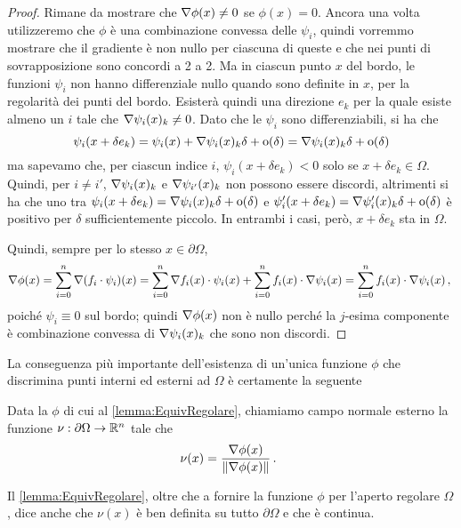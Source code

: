 \begin{proof}
	Rimane da mostrare che $\nabla \phi(x)\neq 0$ se $\phi(x)=0$. Ancora una volta utilizzeremo che $\phi$ è una combinazione convessa delle $\psi_i$, quindi vorremmo mostrare che il gradiente è non nullo per ciascuna di queste e che nei punti di sovrapposizione sono concordi a 2 a 2.
	Ma in ciascun punto $x$ del bordo, le funzioni $\psi_i$ non hanno differenziale nullo quando sono definite in $x$, per la regolarità dei punti del bordo. Esisterà quindi una direzione $e_k$ per la quale esiste almeno un $i$ tale che $\nabla \psi_i(x)_k\neq 0$.
	Dato che le $\psi_i$ sono differenziabili, si ha che
	\[
		\psi_i(x+\delta e_k)=\psi_i(x)+\nabla \psi_i(x)_k \delta + \mathrm{o}(\delta) = \nabla \psi_i(x)_k \delta + \mathrm{o}(\delta)
	\]
	ma sapevamo che, per ciascun indice $i$, $\psi_i(x+\delta e_k)<0$ solo se $x+\delta e_k\in \Omega$.
	Quindi, per $i\neq i'$, $\nabla \psi_i(x)_k$ e $\nabla \psi_{i'}(x)_k$ non possono essere discordi, altrimenti si ha che uno tra $\psi_i(x+\delta e_k)= \nabla \psi_i(x)_k \delta + \mathrm{o}(\delta)$ e
	$\psi_i'(x+\delta e_k)=\nabla \psi_i'(x)_k \delta + \mathrm{o}(\delta)$ è positivo per $\delta$ sufficientemente piccolo. In entrambi i casi, però, $x+\delta e_k$ sta in $\Omega$.
	
	Quindi, sempre per lo stesso $x\in\partial \Omega$,
	\[ 
		\nabla \phi(x)=\sum_{i=0}^n \nabla (f_i \cdot\psi_i)(x)=\sum_{i=0}^n \nabla f_i(x)\cdot \psi_i(x)+\sum_{i=0}^n f_i(x)\cdot \nabla \psi_i(x)=
		\sum_{i=0}^n f_i(x)\cdot \nabla  \psi_i(x)\, \text{, }
	\]
	poiché $\psi_i\equiv 0$ sul bordo; quindi $\nabla \phi(x)$ non è nullo perché la $j$-esima componente è combinazione convessa di
	$\nabla \psi_i(x)_k$ che sono non discordi.
\end{proof}

La conseguenza più importante dell'esistenza di un'unica funzione $\phi$ che discrimina punti interni ed esterni ad $\Omega$ è certamente la seguente

\begin{definition}
	Data la $\phi$ di cui al \cref{lemma:EquivRegolare}, chiamiamo campo normale esterno la funzione $\nu:\partial\Omega\rightarrow \mathbb R^n$ tale che
	\[
		\nu(x)=\frac{\nabla \phi(x)}{\lVert\nabla \phi(x)\rVert}\, \text{. }
	\]
\end{definition}

\begin{remark}
	Il \cref{lemma:EquivRegolare}, oltre che a fornire la funzione $\phi$ per l'aperto regolare $\Omega$, dice anche che $\nu(x)$ è ben definita
	su tutto $\partial \Omega$ e che è continua.
\end{remark}

